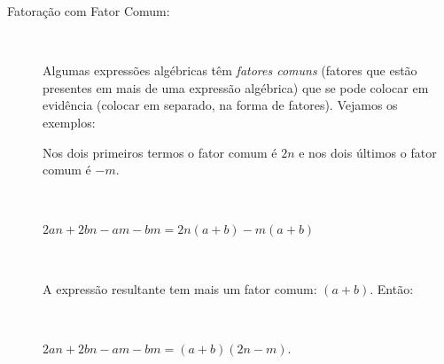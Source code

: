 \begin{description}
\item [Fatoração com Fator Comum:]~

Algumas expressões algébricas têm \textit{fatores comuns} (fatores que estão presentes em mais de uma expressão algébrica) que se pode colocar em evidência (colocar em separado, na forma de fatores). Vejamos os exemplos:
\begin{enumerate}[label=\alph*)]



Nos dois primeiros termos o fator comum é $2n$ e nos dois últimos o fator comum é $-m$.

~~

$2an + 2bn - am - bm = 2n(a+b) - m(a+b)$

~~

A expressão resultante tem mais um fator comum: $(a+b)$. Então:

~~

$2an + 2bn - am - bm = (a+b)(2n-m)$. 
\end{enumerate}
\end{description}

